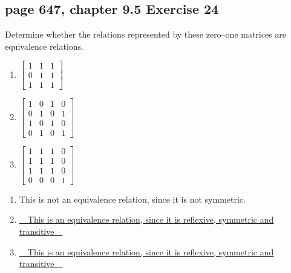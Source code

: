 \documentclass[sigconf]{acmart}
\begin{document}
\subsection{page 647, chapter 9.5 Exercise 24}
\begin{shaded}
    Determine whether the relations represented by these zero–one matrices are equivalence relations.
    \begin{enumerate}[label=(\alph*)]
        \item 
        $
    	\begin{bmatrix}
    	   1 & 1 & 1 \\
     	   0 & 1 & 1 \\
     	   1 & 1 & 1
    	\end{bmatrix}
    	$
    	\item 
    	$
    	\begin{bmatrix}
    	   1 & 0 & 1 & 0 \\
     	   0 & 1 & 0 & 1 \\
           1 & 0 & 1 & 0 \\
     	   0 & 1 & 0 & 1
    	\end{bmatrix}
    	$
    	\item 
    	$
    	\begin{bmatrix}
    	   1 & 1 & 1 & 0 \\
     	   1 & 1 & 1 & 0 \\
           1 & 1 & 1 & 0 \\
     	   0 & 0 & 0 & 1
    	\end{bmatrix}
    	$
    \end{enumerate}
\end{shaded}
\begin{enumerate}[label=(\alph*)]
    \item This is not an equivalence relation, since it is not symmetric.
    \item \underline{~~This is an equivalence relation, since it is reflexive, symmetric and transitive~~}
	\item \underline{~~This is an equivalence relation, since it is reflexive, symmetric and transitive~~}
\end{enumerate}
\end{document}
